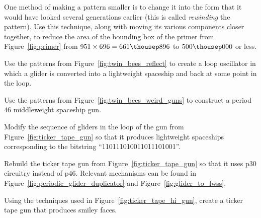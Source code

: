 \begin{multicols}{2}
	\mfilbreak
	
	
	\begin{problem}\label{exer:rewind_primer} 
		One method of making a pattern smaller is to change it into the form that it would have looked several generations earlier (this is called \emph{rewinding} the pattern). Use this technique, along with moving its various components closer together, to reduce the area of the bounding box of the primer from Figure~\ref{fig:primer} from $951 \times 696 = 661{\thousep}896$ to $500{\thousep}000$ or less.
	\end{problem}
	
	
	\mfilbreak
	
	
	\begin{problem}\label{exer:twin_bees_loop} 
		Use the patterns from Figure~\ref{fig:twin_bees_reflect} to create a loop oscillator in which a glider is converted into a lightweight spaceship and back at some point in the loop.
	\end{problem}
	
	
	\mfilbreak
	
	
	\begin{problem}\label{exer:twin_bees_mwss_gun} 
		Use the patterns from Figure~\ref{fig:twin_bees_weird_guns} to construct a period~$46$ middleweight spaceship gun.
	\end{problem}
	
	
	\mfilbreak
	
	
	\begin{problem}\label{exer:ticker_tape_gun_store_different} 
		Modify the sequence of gliders in the loop of the gun from Figure~\ref{fig:ticker_tape_gun} so that it produces lightweight spaceships corresponding to the bitstring ``110111010011011101001''.
	\end{problem}


	\mfilbreak
	
	
	\begin{problem}\label{exer:p30_ticker_tape_gun} 
		Rebuild the ticker tape gun from Figure~\ref{fig:ticker_tape_gun} so that it uses p$30$ circuitry instead of p$46$. Relevant mechanisms can be found in Figure~\ref{fig:periodic_glider_duplicator} and Figure~\ref{fig:glider_to_lwss}.
	\end{problem}
	
	
	\mfilbreak
	
	
	\begin{problem}\label{exer:ticker_tape_smiley_gun} 
		Using the techniques used in Figure~\ref{fig:ticker_tape_hi_gun}, create a ticker tape gun that produces smiley faces.
	\end{problem}
	

\end{multicols}
